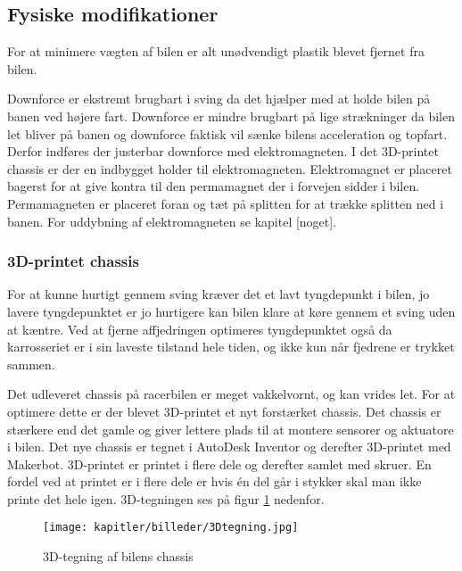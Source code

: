 
\subsection{Fysiske modifikationer}

For at minimere vægten af bilen er alt unødvendigt plastik blevet fjernet fra bilen.

Downforce er ekstremt brugbart i sving da det hjælper med at holde bilen på banen ved højere fart. Downforce er mindre brugbart på lige strækninger da bilen let bliver på banen og downforce faktisk vil sænke bilens acceleration og topfart. Derfor indføres der justerbar downforce med elektromagneten. I det 3D-printet chassis er der en indbygget holder til elektromagneten. Elektromagnet er placeret bagerst for at give kontra til den permamagnet der i forvejen sidder i bilen. Permamagneten er placeret foran og tæt på splitten for at trække splitten ned i banen. For uddybning af elektromagneten se kapitel [noget].

\subsubsection{3D-printet chassis}

For at kunne hurtigt gennem sving kræver det et lavt tyngdepunkt i bilen, jo lavere tyngdepunktet er jo hurtigere kan bilen klare at køre gennem et sving uden at kæntre. Ved at fjerne affjedringen optimeres tyngdepunktet også da karrosseriet er i sin laveste tilstand hele tiden, og ikke kun når fjedrene er trykket sammen.

Det udleveret chassis på racerbilen er meget vakkelvornt, og kan vrides let. For at optimere dette er der blevet 3D-printet et nyt forstærket chassis. Det chassis er stærkere end det gamle og giver lettere plads til at montere sensorer og aktuatore i bilen. Det nye chassis er tegnet i AutoDesk Inventor og derefter 3D-printet med Makerbot. 3D-printet er printet i flere dele og derefter samlet med skruer. En fordel ved at printet er i flere dele er hvis én del går i stykker skal man ikke printe det hele igen. 3D-tegningen ses på figur \ref{fig:3Dtegning} nedenfor.

\begin{figure}[ht]
    \centering
    \texttt{[image: kapitler/billeder/3Dtegning.jpg]}
    \caption{3D-tegning af bilens chassis}
    \label{fig:3Dtegning}
\end{figure}


